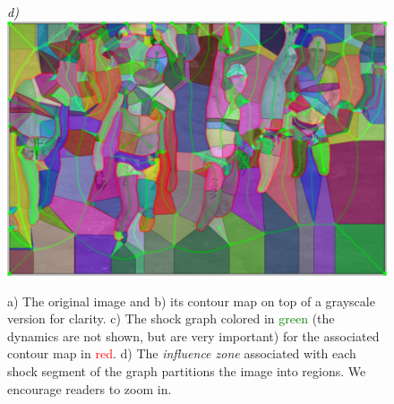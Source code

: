 \begin{figure}[!ht]
{\footnotesize\textit{\textcolor{black}{d)}}}\includegraphics[width=0.228\linewidth]{figs/370036_00_atomic_frags.png}
\caption{a) The original image and b) its contour map on top of a grayscale version for clarity. c) The shock graph colored in \textcolor{green}{green} (the dynamics are not shown, but are very important) for the associated contour map in \textcolor{red}{red}. d) The \emph{influence zone} associated with each shock segment of the graph partitions the image into regions. We encourage readers to zoom in.}
\label{fig:pipeline}
\end{figure}

